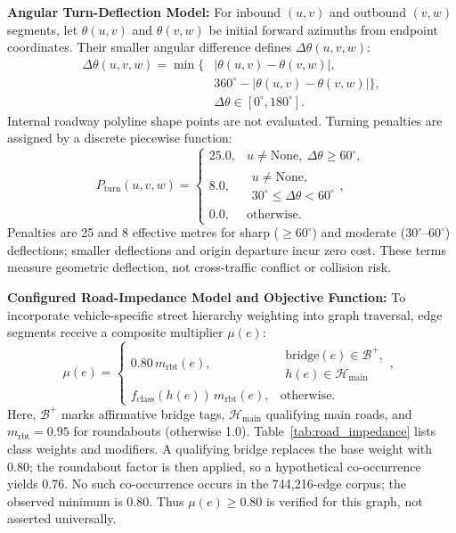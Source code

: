 \documentclass[11pt,conference]{IEEEtran}
\begin{document}
\noindent\textbf{Angular Turn-Deflection Model:} For inbound $(u,v)$ and outbound $(v,w)$ segments, let $\theta(u,v)$ and $\theta(v,w)$ be initial forward azimuths from endpoint coordinates. Their smaller angular difference defines $\Delta\theta(u,v,w)$:
\begin{equation*}
\begin{aligned}
\Delta\theta(u,v,w) = \min\{&
|\theta(u,v)-\theta(v,w)|,\\
&360^\circ-|\theta(u,v)-\theta(v,w)|\},\\
&\Delta\theta\in[0^\circ,180^\circ].
\end{aligned}
\end{equation*}
Internal roadway polyline shape points are not evaluated. Turning penalties are assigned by a discrete piecewise function:
\begin{equation}
\label{eq:turn_penalty}
P_{\text{turn}}(u,v,w)=
\begin{cases}
25.0, & u\ne\mathrm{None},\ \Delta\theta\ge60^\circ,\\
8.0, & \substack{u\ne\mathrm{None},\\30^\circ\le\Delta\theta<60^\circ},\\
0.0, & \text{otherwise}.
\end{cases}
\end{equation}
Penalties are 25 and 8 effective metres for sharp ($\ge60^\circ$) and moderate ($30^\circ$--$60^\circ$) deflections; smaller deflections and origin departure incur zero cost. These terms measure geometric deflection, not cross-traffic conflict or collision risk.

\noindent\textbf{Configured Road-Impedance Model and Objective Function:} To incorporate vehicle-specific street hierarchy weighting into graph traversal, edge segments receive a composite multiplier $\mu(e)$:
\begin{equation}
\label{eq:road_impedance}
\mu(e)=
\begin{cases}
0.80\,m_{\mathrm{rbt}}(e), &
\substack{\text{bridge}(e)\in\mathcal{B}^{+},\\
h(e)\in\mathcal{H}_{\mathrm{main}}},\\
f_{\mathrm{class}}(h(e))\,m_{\mathrm{rbt}}(e), & \text{otherwise}.
\end{cases}
\end{equation}
Here, $\mathcal{B}^+$ marks affirmative bridge tags, $\mathcal{H}_{\mathrm{main}}$ qualifying main roads, and $m_{\mathrm{rbt}}=0.95$ for roundabouts (otherwise 1.0). Table~\ref{tab:road_impedance} lists class weights and modifiers. A qualifying bridge replaces the base weight with 0.80; the roundabout factor is then applied, so a hypothetical co-occurrence yields 0.76. No such co-occurrence occurs in the 744,216-edge corpus; the observed minimum is 0.80. Thus $\mu(e)\ge0.80$ is verified for this graph, not asserted universally.
\end{document}

